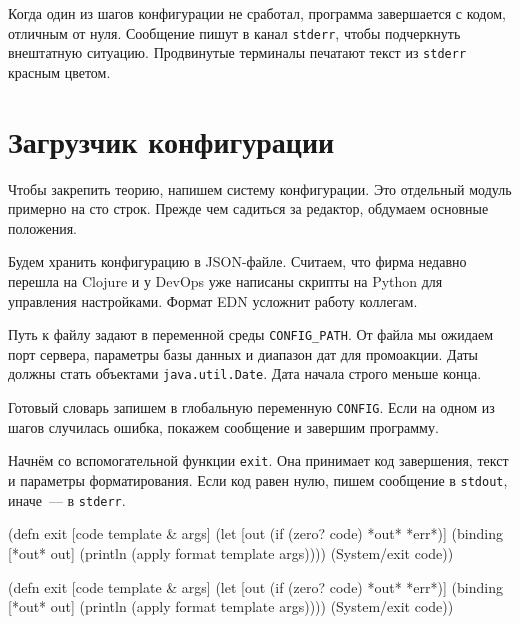 
Когда один из шагов конфигурации не сработал, программа завершается с кодом,
отличным от нуля. Сообщение пишут в канал \verb|stderr|, чтобы подчеркнуть
внештатную ситуацию. Продвинутые терминалы печатают текст из \verb|stderr|
красным цветом.

\section{Загрузчик конфигурации}


Чтобы закрепить теорию, напишем систему конфигурации. Это отдельный модуль
примерно на сто строк. Прежде чем садиться за редактор, обдумаем основные
положения.

Будем хранить конфигурацию в JSON-файле. Считаем, что фирма недавно перешла на
Clojure и у DevOps уже написаны скрипты на Python для управления
настройками. Формат EDN усложнит работу коллегам.


Путь к файлу задают в переменной среды \verb|CONFIG_PATH|. От файла мы ожидаем
порт сервера, параметры базы данных и диапазон дат для промоакции. Даты должны
стать объектами \verb|java.util.Date|. Дата начала строго меньше конца.

Готовый словарь запишем в глобальную переменную \verb|CONFIG|. Если на одном
из шагов случилась ошибка, покажем сообщение и завершим программу.

Начнём со вспомогательной функции \verb|exit|. Она принимает код завершения,
текст и параметры форматирования. Если код равен нулю, пишем сообщение в
\verb|stdout|, иначе~--- в \verb|stderr|.


\ifx\devicetype\mobile

\begin{english}
  \begin{clojure}
(defn exit
  [code template & args]
  (let [out (if (zero? code)
              *out*
              *err*)]
    (binding [*out* out]
      (println (apply format
        template args))))
  (System/exit code))
  \end{clojure}
\end{english}

\else

\begin{english}
  \begin{clojure}
(defn exit
  [code template & args]
  (let [out (if (zero? code) *out* *err*)]
    (binding [*out* out]
      (println (apply format template args))))
  (System/exit code))
  \end{clojure}
\end{english}

